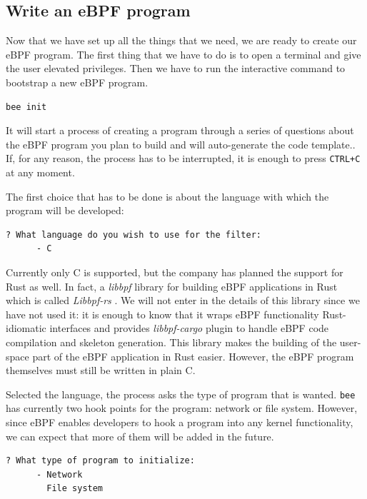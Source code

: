 \subsection{Write an eBPF program}

Now that we have set up all the things that we need, we are ready to create our eBPF program.
The first thing that we have to do is to open a terminal and give the user elevated privileges.
Then we have to run the interactive command to bootstrap a new eBPF program.

\begin{lstlisting}[language=bash, caption={bee init command}]
	bee init
\end{lstlisting}

It will start a process of creating a program through a series of questions about the eBPF program you plan to build and will auto-generate the code template..
If, for any reason, the process has to be interrupted, it is enough to press \verb|CTRL+C| at any moment.

The first choice that has to be done is about the language with which the program will be developed:

\begin{lstlisting}[language=bash, caption={bee language selection}]
	? What language do you wish to use for the filter: 
	  - C
\end{lstlisting}

Currently only C is supported, but the company has planned the support for Rust as well.
In fact, a \textit{libbpf} library for building eBPF applications in Rust which is called \textit{Libbpf-rs} \cite{libbpfRustGithubRepo}.
We will not enter in the details of this library since we have not used it: it is enough to know that it wraps eBPF functionality Rust-idiomatic interfaces and provides \textit{libbpf-cargo} plugin to handle eBPF code compilation and skeleton generation.
This library makes the building of the user-space part of the eBPF application in Rust easier.
However, the eBPF program themselves must still be written in plain C.

Selected the language, the process asks the type of program that is wanted.
\verb|bee| has currently two hook points for the program: network or file system.
However, since eBPF enables developers to hook a program into any kernel functionality, we can expect that more of them will be added in the future.

\begin{lstlisting}[language=bash, caption={bee type of program selection}]
	? What type of program to initialize: 
	  - Network
	    File system
\end{lstlisting}


